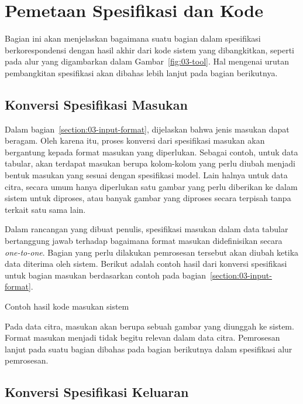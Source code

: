 \section{Pemetaan Spesifikasi dan Kode}

Bagian ini akan menjelaskan bagaimana suatu bagian dalam spesifikasi berkorespondensi dengan hasil akhir dari kode sistem yang dibangkitkan, seperti pada alur yang digambarkan dalam Gambar~\ref{fig:03-tool}.
Hal mengenai urutan pembangkitan spesifikasi akan dibahas lebih lanjut pada bagian berikutnya.

\subsection{Konversi Spesifikasi Masukan}

Dalam bagian~\ref{section:03-input-format}, dijelaskan bahwa jenis masukan dapat beragam.
Oleh karena itu, proses konversi dari spesifikasi masukan akan bergantung kepada format masukan yang diperlukan.
Sebagai contoh, untuk data tabular, akan terdapat masukan berupa kolom-kolom yang perlu diubah menjadi bentuk masukan yang sesuai dengan spesifikasi model.
Lain halnya untuk data citra, secara umum hanya diperlukan satu gambar yang perlu diberikan ke dalam sistem untuk diproses, atau banyak gambar yang diproses secara terpisah tanpa terkait satu sama lain.

Dalam rancangan yang dibuat penulis, spesifikasi masukan dalam data tabular bertanggung jawab terhadap bagaimana format masukan didefinisikan secara \textit{one-to-one}.
Bagian yang perlu dilakukan pemrosesan tersebut akan diubah ketika data diterima oleh sistem.
Berikut adalah contoh hasil dari konversi spesifikasi untuk bagian masukan berdasarkan contoh pada bagian~\ref{section:03-input-format}.

\begin{listing}[H]
	\caption{Contoh hasil kode masukan sistem}
	\label{listing:10}
\end{listing}

Pada data citra, masukan akan berupa sebuah gambar yang diunggah ke sistem.
Format masukan menjadi tidak begitu relevan dalam data citra.
Pemrosesan lanjut pada suatu bagian dibahas pada bagian berikutnya dalam spesifikasi alur pemrosesan. 

\subsection{Konversi Spesifikasi Keluaran}

